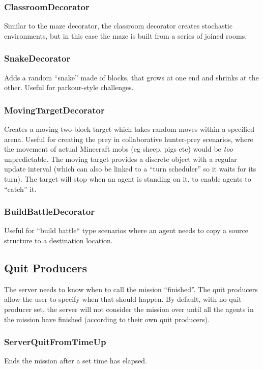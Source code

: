 \documentclass[11pt]{article} %
\begin{document}
\subsubsection{ClassroomDecorator}
Similar to the maze decorator, the classroom decorator creates stochastic environments, but in this case the maze is built from a series of joined rooms.

\subsubsection{SnakeDecorator}
Adds a random ``snake'' made of blocks, that grows at one end and shrinks at the other. Useful for parkour-style challenges.

\subsubsection{MovingTargetDecorator}
Creates a moving two-block target which takes random moves within a specified arena. Useful for creating the prey in collaborative hunter-prey scenarios, where the movement of actual Minecraft mobs (eg sheep, pigs etc) would be \emph{too} unpredictable. The moving target provides a discrete object with a regular update interval (which can also be linked to a ``turn scheduler'' so it waits for its turn). The target will stop when an agent is standing on it, to enable agents to ``catch'' it.

\subsubsection{BuildBattleDecorator}
Useful for ``build battle`` type scenarios where an agent needs to copy a source structure to a destination location.

\subsection{Quit Producers}
The server needs to know when to call the mission ``finished''. The quit producers allow the user to specify when that should happen. By default, with no quit producer set, the server will not consider the mission over until all the agents in the mission have finished (according to their own quit producers).

\subsubsection{ServerQuitFromTimeUp}
Ends the mission after a set time has elapsed.
\end{document}
